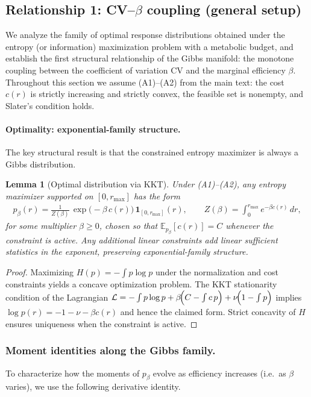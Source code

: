 \documentclass[11pt]{article}
\newcommand{\EE}{\mathbb{E}}
\newtheorem{lemma}[theorem]{Lemma}
\theoremstyle{remark}
\theoremstyle{definition}
\begin{document}
\subsection{Relationship 1: CV--$\beta$ coupling (general setup)}
\label{sec:cv-beta-general}

We analyze the family of optimal response distributions obtained under the entropy (or information) maximization problem with a metabolic budget, and establish the first structural relationship of the Gibbs manifold: the monotone coupling between the coefficient of variation $\mathrm{CV}$ and the marginal efficiency $\beta$.  Throughout this section we assume (A1)--(A2) from the main text: the cost $c(r)$ is strictly increasing and strictly convex, the feasible set is nonempty, and Slater's condition holds.

\paragraph{Optimality: exponential-family structure.}
The key structural result is that the constrained entropy maximizer is always a Gibbs distribution.

\begin{lemma}[Optimal distribution via KKT]
\label{lem:gibbs}
Under (A1)--(A2), any entropy maximizer supported on $[0,r_{\max}]$ has the form
\begin{align}
p_\beta(r)
= \frac{1}{Z(\beta)}\,\exp\!\bigl(-\beta\,c(r)\bigr)\,
\mathbf{1}_{[0,r_{\max}]}(r), 
\qquad 
Z(\beta)=\int_0^{r_{\max}} e^{-\beta c(r)}\,dr,
\end{align}
for some multiplier $\beta\ge 0$, chosen so that 
$\EE_{p_\beta}[c(r)] = C$ whenever the constraint is active.
Any additional \emph{linear} constraints add linear sufficient statistics in the exponent, preserving exponential-family structure.
\end{lemma}

\begin{proof}
Maximizing 
$H(p)=-\int p\log p$ 
under the normalization and cost constraints yields a concave optimization problem.  
The KKT stationarity condition of the Lagrangian
\(
\mathcal{L}= -\int p\log p
+ \beta\!\Bigl(C-\int c\,p\Bigr)
+ \nu\!\Bigl(1-\int p\Bigr)
\)
implies $\log p(r) = -1-\nu - \beta c(r)$ and hence the claimed form.  
Strict concavity of $H$ ensures uniqueness when the constraint is active.
\end{proof}

\subsubsection{Moment identities along the Gibbs family.}
To characterize how the moments of $p_\beta$ evolve as efficiency increases (i.e.\ as $\beta$ varies), we use the following derivative identity.
\end{document}
